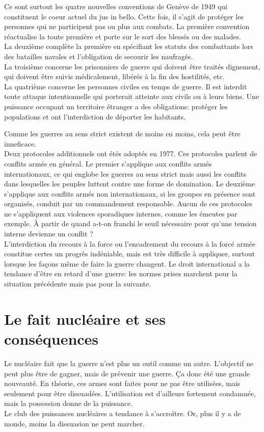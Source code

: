 \documentclass[10pt, a4paper, openany]{book}
\begin{document}
Ce sont surtout les quatre nouvelles conventions de Genève de 1949 qui constituent le coeur actuel du jus in bello. Cette fois, il s'agit de protéger les personnes qui ne participent pas ou plus aux combats. La première convention réactualise la toute première et porte sur le sort des blessés ou des malades. \\
La deuxième complète la première en spécifiant les statuts des combattants lors des batailles navales et l'obligation de secourir les naufragés. \\
La troisième concerne les prisonniers de guerre qui doivent être traités dignement, qui doivent être suivis médicalement, libérés à la fin des hostilités, etc. \\
La quatrième concerne les personnes civiles en temps de guerre. Il est interdit toute attaque intentionnelle qui porterait atteinte aux civils ou à leurs biens. Une puissance occupant un territoire étranger a des obligations: protéger les populations et ont l'interdiction de déporter les habitants. 


Comme les guerres au sens strict existent de moins en moins, cela peut être inneficace. \\
Deux protocoles additionnels ont étés adoptés en 1977. Ces protocoles parlent de conflits armés en général. Le premier s'applique aux conflits armés internationaux, ce qui englobe les guerres au sens strict mais aussi les conflits dans lesquelles les peuples luttent contre une forme de domination. Le deuxième s'applique aux conflits armés non internationaux, si les groupes en présence sont organisés, conduit par un commandement responsable. Aucun de ces protocoles ne s'appliquent aux violences sporadiques internes, comme les émeutes par exemple. À partir de quand a-t-on franchi le seuil nécessaire pour qu'une tension interne devienne un conflit ? \\
L'interdiction du recours à la force ou l'encadrement du recours à la forcé armée constitue certes un progrès indéniable, mais est très difficile à appliquer, surtout lorsque les façons même de faire la guerre changent. Le droit international a la tendance d'être en retard d'une guerre: les normes prises marchent pour la situation précédente mais pas pour la suivante. 

\section{Le fait nucléaire et ses conséquences}

Le nucléaire fait que la guerre n'est plus un outil comme un autre. L'objectif ne peut plus être de gagner, mais de prévenir une guerre. Ça donc été une grande nouveauté. En théorie, ces armes sont faites pour ne pas être utilisées, mais seulement pour être dissuadées. L'utilisation est d'ailleurs fortement condamnée, mais la possession donne de la puissance. \\
Le club des puissances nucléaires a tendance à s'accroître. Or, plus il y a de monde, moins la dissuasion ne peut marcher. 
\end{document}

